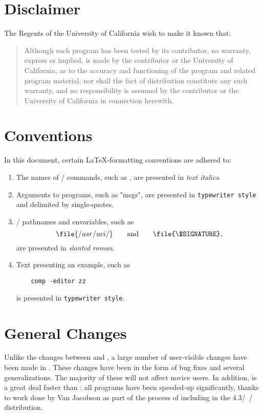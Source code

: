 \section*	{Disclaimer}
The Regents of the University of California wish to make it known that:
\begin{quote}
Although each program has been tested by its contributor,
no warranty, express or implied,
is made by the contributor or the University of California,
as to the accuracy and functioning of the program
and related program material,
nor shall the fact of distribution constitute any such warranty,
and no responsibility is assumed by the contributor
or the University of California in connection herewith.
\end{quote}

\newpage
\section*	{Conventions}
In this document,
certain \LaTeX -formatting conventions are adhered to:
\begin{enumerate}
\item	The names of \unix/ commands, such as ,
are presented in {\it text italics}.

\item	Arguments to programs, such as \arg"msgs",
are presented in {\tt typewriter style} and delimited by single-quotes.

\item	\unix/ pathnames and envariables,
such as $$\file{/usr/uci/}\hbox{\qquad and\qquad}\file{\$SIGNATURE},$$
are presented in {\sl slanted roman}.

\item	Text presenting an example, such as
\begin{verbatim}
    comp -editor zz
\end{verbatim}
is presented in {\tt typewriter style}.
\end{enumerate}

\newpage
\section*	{General Changes}
Unlike the changes between  and ,
a large number of user-visible changes have been made in .
These changes have been in the form of bug fixes and several generalizations.
The majority of these will not affect novice users.
In addition,  is a great deal faster than :
all programs have been speeded-up significantly,
thanks to work done by Van Jacobson as part of the process of including 
in the 4.3\bsd/~\unix/ distribution.

